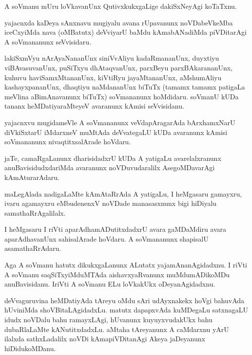 \documentclass{article}
\begin{document}
\begin{mn}
A soVmanu mUru loVkavanUnx QutivxkukxgaLige dakiSxNeyAgi koTaTxnu.
\end{mn}

\begin{mn}
yajacnxda kaDeya sAnxnavu mugiyalu avana rUpavanunx noVDabeVkeMba
iceCxyiMda nava (oMBatutx) deVviyarU baMdu kAmabANadiMda piVDitarAgi A
soVmananunx seVvisidaru.
\end{mn}

\begin{mn}%
lakiSxmVyu nArAyaNananUnx siniVvAliyu kadaRmananUnx, duyxtiyu
viBAvasuvanUnx, puSiTxyu dhAtaqvanUnx, parxBeyu parxBAkarananUnx,
kuhuvu haviSamxMtananUnx, kiVtiRyu jayaMtananUnx, aMshumAliyu
kashayxpananUnx, dhaqtiyu naMdananUnx biTuTx (tamamx tamamx patigaLa
meVlina aBimAnavanunx biTuTx) soVmananunx hoMdidaru. soVmanU kUDa
tananx heMDatiyaraMteyeV avaranunx kAmisi seVvisidanu.
\end{mn}

\begin{mn}%
yajacnxvu mugidameVle A soVmananunx veVdapAragarAda bArxhamxNarU
diVkiSxtarU iMdarxneV muMtAda deVvategaLU kUDa avaranunx kAmisi
soVmananunx nivaqtitxsalArade hoVdaru.
\end{mn}

\begin{mn}
jaTe, camaRgaLanunx dharisidadxrU kUDa A yatigaLu avarelalxranunx
anuBavisidudxdariMda avaranunx noVDuvudaralilx AsegoMDavarAgi kAmAturarAdaru.
\end{mn}

\begin{mn}
maLegAlada nadigaLaMte kAmAtaRrAda A yatigaLu, I heMgasaru gamayxru,
ivaru agamayxru eMbudenenxV noVDade manasasxnunx bigi hiDiyalu samathaRrAgalilalx.
\end{mn}

\begin{mn}
I heMgasaru I riVti aparAdhamADutitxdadxrU avara gaMDaMdiru avara
aparAdhavanUnx sahisalArade hoVdaru. A soVmananunx shapisalU asamathaRrAdaru.
\end{mn}

\begin{mn}%
Aga A soVmanu hatutx dikukxgaLanunx ALutatx yajamAnanAgidadxnu. I
riVti A soVmanu saqSiTxyiMduMTAda aishavxyaRvanunx muMdumADikoMDu
anuBavisidanu. IriVti A soVmanu ELu loVkakUkx oDeyanAgidadxnu.
\end{mn}

\begin{mn}%
deVvaguruvina heMDatiyAda tAreyu oMdu sAri udAyxnakekx hoVgi bahuvAda
hUviniMda shoVBitaLAgidadxLu. matutx dapapxvAda kuMDegaLu satxnagaLU
idudx noVDalu bahu ramayxLAgi, hUvanunx kuyuyxvudakUkx bahu
dubaRlaLaMte kANutitxdadxLu. aMtaha tAreyanunx A caMdarxnu yArU
ilalxda sathxLadalilx noVDi kAmapiVDitanAgi Akeya jaDeyanunx hiDidukoMDanu.
\end{mn}
\end{document}
